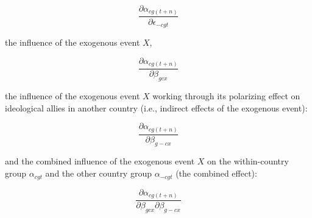 \documentclass[12pt]{article}
\begin{document}
\begin{equation}
\frac{\partial \alpha_{cg(t+n)}}{\partial \epsilon_{-cgt}}
\end{equation}

the influence of the exogenous event $X$,

\begin{equation}
\frac{\partial \alpha_{cg(t+n)}}{\partial \beta_{gcx}}
\end{equation}

the influence of the exogenous event $X$ working through its polarizing effect on ideological allies in another country (i.e., indirect effects of the exogenous event):

\begin{equation}
\frac{\partial \alpha_{cg(t+n)}}{\partial \beta_{g-cx}}
\end{equation}

and the combined influence of the exogenous event $X$ on the within-country group $\alpha_{cgt}$ and the other country group $\alpha_{-cgt}$ (the combined effect):

\begin{equation}
\frac{\partial \alpha_{cg(t+n)}}{\partial \beta_{gcx}\partial \beta_{g-cx}}
\end{equation}
\end{document}
